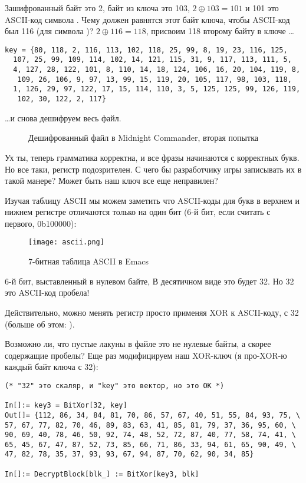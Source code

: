 Зашифрованный байт это 2, байт из ключа это 103, $2 \oplus 103=101$ и 101 это ASCII-код символа .
Чему должен равнятся этот байт ключа, чтобы ASCII-код был 116 (для символа  )?
$2 \oplus 116=118$, присвоим 118 второму байту в ключе \dots

\begin{lstlisting}[style=custommath]
key = {80, 118, 2, 116, 113, 102, 118, 25, 99, 8, 19, 23, 116, 125, 
  107, 25, 99, 109, 114, 102, 14, 121, 115, 31, 9, 117, 113, 111, 5, 
  4, 127, 28, 122, 101, 8, 110, 14, 18, 124, 106, 16, 20, 104, 119, 8,
   109, 26, 106, 9, 97, 13, 99, 15, 119, 20, 105, 117, 98, 103, 118, 
  1, 126, 29, 97, 122, 17, 15, 114, 110, 3, 5, 125, 125, 99, 126, 119,
   102, 30, 122, 2, 117}
\end{lstlisting}

\dots и снова дешифруем весь файл.

\begin{figure}[H]
\centering
{}
\caption{Дешифрованный файл в Midnight Commander, вторая попытка}
\end{figure}

Ух ты, теперь грамматика корректна, и все фразы начинаются с корректных букв.
Но все таки, регистр подозрителен.
С чего бы разработчику игры записывать их в такой манере?
Может быть наш ключ все еще неправилен?

Изучая таблицу ASCII мы можем заметить что ASCII-коды для букв в верхнем и нижнем регистре отличаются только на один бит
(6-й бит, если считать с первого, 0b100000):

\begin{figure}[H]
\centering
\texttt{[image: ascii.png]}
\caption{7-битная таблица \ac{ASCII} в Emacs}
\end{figure}

6-й бит, выставленный в нулевом байте, В десятичном виде это будет 32.
Но 32 это ASCII-код пробела!

Действительно, можно менять регистр просто применяя XOR к ASCII-коду, с 32 (больше об этом: ).

Возможно ли, что пустые лакуны в файле это не нулевые байты, а скорее содержащие пробелы?
Еще раз модифицируем наш XOR-ключ (я про-XOR-ю каждый байт ключа с 32):

\begin{lstlisting}[style=custommath]
(* "32" это скаляр, и "key" это вектор, но это OK *)

In[]:= key3 = BitXor[32, key]
Out[]= {112, 86, 34, 84, 81, 70, 86, 57, 67, 40, 51, 55, 84, 93, 75, \
57, 67, 77, 82, 70, 46, 89, 83, 63, 41, 85, 81, 79, 37, 36, 95, 60, \
90, 69, 40, 78, 46, 50, 92, 74, 48, 52, 72, 87, 40, 77, 58, 74, 41, \
65, 45, 67, 47, 87, 52, 73, 85, 66, 71, 86, 33, 94, 61, 65, 90, 49, \
47, 82, 78, 35, 37, 93, 93, 67, 94, 87, 70, 62, 90, 34, 85}

In[]:= DecryptBlock[blk_] := BitXor[key3, blk]
\end{lstlisting}


